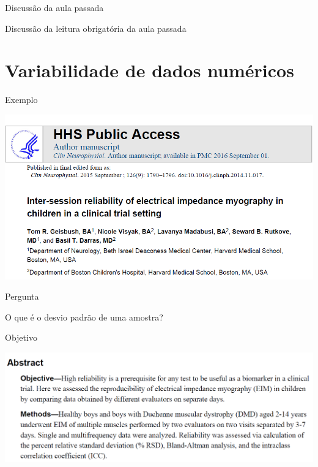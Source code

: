 \documentclass{beamer}
\begin{document}

\begin{frame}{\scriptsize Discussão da aula passada}
  \begin{block}{}
    \footnotesize
    Discussão da leitura obrigatória da aula passada
  \end{block}
\end{frame}

\section{Variabilidade de dados numéricos}

\begin{frame}{\scriptsize Exemplo}
  \begin{center}
    \includegraphics[width=1.2\textwidth]{Cap3/DP1}
  \end{center}
\end{frame}


\begin{frame}[label=oquee]{\scriptsize Pergunta}
  \begin{block}{}
    \Large\centering
    O que é o desvio padrão de uma amostra?
  \end{block}
\end{frame}

\begin{frame}{\scriptsize Objetivo}
  \begin{center}
    \includegraphics[width=1.2\textwidth]{Cap3/RSD0}
  \end{center}
\end{frame}
\end{document}
